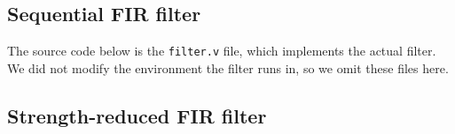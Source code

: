 \subsection{Sequential FIR filter}

The source code below is the \texttt{filter.v} file, which implements the actual filter.
We did not modify the environment the filter runs in, so we omit these files here.



\subsection{Strength-reduced FIR filter}
